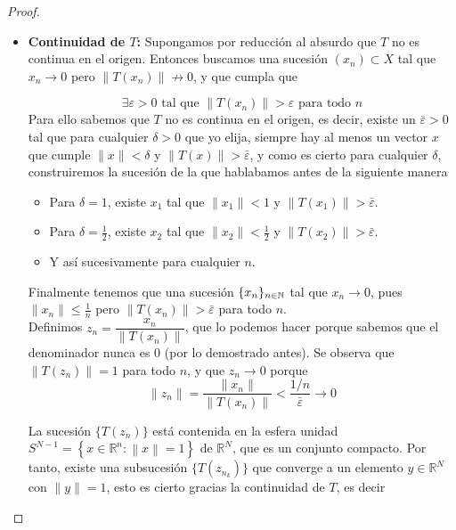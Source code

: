 \begin{prop}
\begin{proof}
\begin{itemize}
        \item \textbf{Continuidad de $T$:} Supongamos por reducción al absurdo que $T$ no es continua en el origen. Entonces buscamos una sucesión $(x_n) \subset X$ tal que $x_n \to 0$ pero $\|T(x_n)\| \not\to 0$, y que cumpla que

        \begin{equation*}
                \exists \varepsilon > 0 \text{ tal que } \|T(x_n)\| > \varepsilon \text{ para todo } n
        \end{equation*}
        Para ello sabemos que $T$ no es continua en el origen, es decir, existe un $\bar{\varepsilon} > 0$ tal que para cualquier $\delta > 0$ que yo elija, siempre hay al menos un vector $x$ que cumple $\|x\| < \delta$ y $\|T(x)\| > \bar{\varepsilon}$, y como es cierto para cualquier $\delta$, construiremos la sucesión de la que hablabamos antes de la siguiente manera

        \begin{itemize}
            \item Para $\delta = 1$, existe $x_1$ tal que $\|x_1\| < 1$ y $\|T(x_1)\| > \bar{\varepsilon}$.
            \item Para $\delta = \frac{1}{2}$, existe $x_2$ tal que $\|x_2\| < \frac{1}{2}$ y $\|T(x_2)\| > \bar{\varepsilon}$.
            \item Y así sucesivamente para cualquier $n$.
        \end{itemize}
        Finalmente tenemos que una sucesión $\{x_n\}_{n\in \mathbb{N}}$ tal que $x_n \to 0$, pues $\|x_n\| \leq \frac{1}{n}$ pero $\|T(x_n)\| > \bar{\varepsilon}$ para todo $n$. \\
        
        \noindent
        Definimos $z_n = \dfrac{x_n}{\|T(x_n)\|}$, que lo podemos hacer porque sabemos que el denominador nunca es $0$ (por lo demostrado antes). Se observa que $\|T(z_n)\| = 1$ para todo $n$, y que $z_n\to 0$ porque 
        \begin{equation*}
            \|z_n\| = \frac{\|x_n\|}{\|T(x_n)\|} < \frac{1/n}{\bar{\varepsilon}} \to 0
        \end{equation*} 
        
        \noindent
        La sucesión $\{T(z_n)\}$ está contenida en la esfera unidad $S^{N-1}=\left\{x\in \mathbb {R} ^{n}:\left\|x\right\|=1\right\}$ de $\mathbb{R}^N$, que es un conjunto compacto. Por tanto, existe una subsucesión $\{T(z_{n_k})\}$ que converge a un elemento $y \in \mathbb{R}^N$ con $\|y\| = 1$, esto es cierto gracias la continuidad de $T$, es decir


\end{itemize}
\end{proof}
\end{prop}
